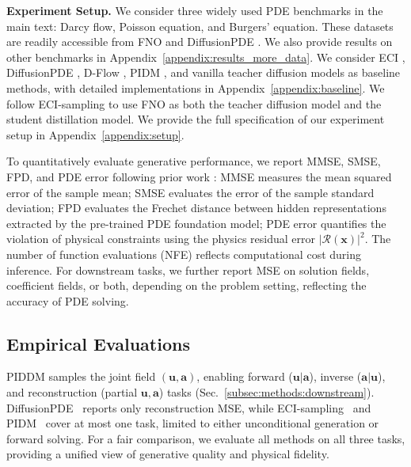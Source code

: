 \documentclass{article}
\theoremstyle{plain}
\theoremstyle{definition}
\theoremstyle{remark}
\def\va{{\bm{a}}}
\def\vu{{\bm{u}}}
\def\vx{{\bm{x}}}
\begin{document}
\noindent\textbf{Experiment Setup.}
We consider three widely used PDE benchmarks in the main text: Darcy flow, Poisson equation, and Burgers' equation. These datasets are readily accessible from FNO \cite{li2020fno} and DiffusionPDE \cite{huang2024diffusionpde}. We also provide results on other benchmarks in Appendix~\ref{appendix:results_more_data}. We consider ECI \cite{cheng2025eci}, DiffusionPDE \cite{huang2024diffusionpde}, D-Flow \cite{cheng2025eci, ben2024dflow}, PIDM \cite{bastek2025pdim}, and vanilla teacher diffusion models as baseline methods, with detailed implementations in Appendix~\ref{appendix:baseline}. We follow ECI-sampling \cite{cheng2025eci} to use FNO as both the teacher diffusion model and the student distillation model. We provide the full specification of our experiment setup in Appendix~\ref{appendix:setup}.

To quantitatively evaluate generative performance, we report MMSE, SMSE, FPD, and PDE error following prior work \cite{cheng2025eci, kerrigan2023functional, bastek2025pdim, jacobsen2024cocogen}: MMSE measures the mean squared error of the sample mean; SMSE evaluates the error of the sample standard deviation; FPD evaluates the Frechet distance between hidden representations extracted by the pre-trained PDE foundation model; PDE error quantifies the violation of physical constraints using the physics residual error $\lvert \mathcal{R}(\vx)\rvert^2$. The number of function evaluations (NFE) reflects computational cost during inference. For downstream tasks, we further report MSE on solution fields, coefficient fields, or both, depending on the problem setting, reflecting the accuracy of PDE solving.

\subsection{Empirical Evaluations}
PIDDM samples the joint field \((\vu,\va)\), enabling forward (\(\vu|\va\)), inverse (\(\va|\vu\)), and reconstruction (partial \(\vu,\va\)) tasks (Sec.~\ref{subsec:methods:downstream}). DiffusionPDE~\cite{huang2024diffusionpde} reports only reconstruction MSE, while ECI-sampling~\cite{cheng2025eci} and PIDM~\cite{bastek2025pdim} cover at most one task, limited to either unconditional generation or forward solving. For a fair comparison, we evaluate all methods on all three tasks, providing a unified view of generative quality and physical fidelity.
\end{document}
